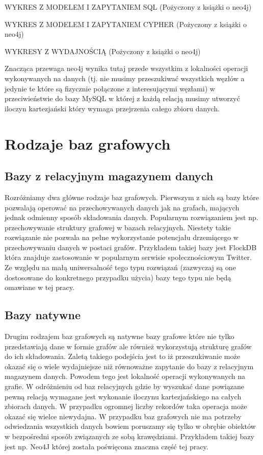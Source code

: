 \documentclass[brudnopis]{xmgr}
\begin{document}
WYKRES Z MODELEM I ZAPYTANIEM SQL (Pożyczony z książki o neo4j)

WYKRES Z MODELEM I ZAPYTANIEM CYPHER (Pożyczony z książki o neo4j)

WYKRESY Z WYDAJNOŚCIĄ (Pożyczony z książki o neo4j)

Znacząca przewaga neo4j wynika tutaj przede wszystkim z lokalności operacji wykonywanych na danych (tj. nie musimy przeszukiwać wszystkich węzłów a jedynie te które są fizycznie połączone z interesującymi węzłami) w przeciwieństwie do bazy MySQL w której z każdą relacją musimy utworzyć iloczyn kartezjański który wymaga przejrzenia całego zbioru danych.

\section{Rodzaje baz grafowych}

\subsection{Bazy z relacyjnym magazynem danych}

Rozróżniamy dwa główne rodzaje baz grafowych. Pierwszym z nich są bazy które pozwalają operować na przechowywanych danych jak na grafach, mających jednak odmienny sposób składowania danych. Popularnym rozwiązaniem jest np. przechowywanie struktury grafowej w bazach relacyjnych. Niestety takie rozwiązanie nie pozwala na pełne wykorzystanie potencjału drzemiącego w przechowywaniu danych w postaci grafów. Przykładem takiej bazy jest FlockDB która znajduje zastosowanie w popularnym serwisie społecznościowym Twitter. Ze względu na małą uniwersalność tego typu rozwiązań (zazwyczaj są one dostosowane do konkretnego przypadku użycia) bazy tego typu nie będą omawiane w tej pracy.

\subsection{Bazy natywne}
Drugim rodzajem baz grafowych są natywne bazy grafowe które nie tylko przedstawiają dane w formie grafów ale również wykorzystują strukturę grafów do ich składowania. Zaletą takiego podejścia jest to iż przeszukiwanie może okazać się o wiele wydajniejsze niż równoważne zapytanie do bazy z relacyjnym magazynem danych. Powodem tego jest lokalność operacji wykonywanych na grafie. W odróżnieniu od baz relacyjnych gdzie by wyszukać dane powiązane pewną relacją wymagane jest wykonanie iloczynu kartezjańskiego na całych zbiorach danych. W przypadku ogromnej liczby rekordów taka operacja może okazać się wielce niewydajna. W przypadku baz grafowych nie ma potrzeby odwiedzania wszystkich danych bowiem poruszamy się tylko w obrębie obiektów w bezpośredni sposób związanych ze sobą krawędziami. Przykładem takiej bazy jest np. Neo4J której została poświęcona znaczna część tej pracy.
\end{document}
